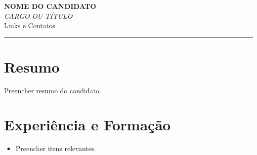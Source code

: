 \documentclass[10pt,a4paper]{article}
\newcommand{\cvheader}[3]{%
    \begin{center}
        {\LARGE\bfseries\color{primary} #1}\\[4pt]
        {\large\itshape #2}\\[4pt]
        {\small #3}
    \end{center}
    \hrule\vspace{8pt}
}
\begin{document}
\cvheader{NOME DO CANDIDATO}{CARGO OU TÍTULO}{Links e Contatos}

\section*{Resumo}
Preencher resumo do candidato.

\section*{Experiência e Formação}
\begin{itemize}[leftmargin=1.2em]
    \item Preencher itens relevantes.
\end{itemize}
\end{document}

